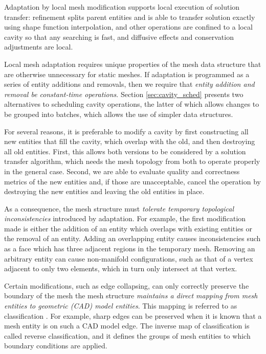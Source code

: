 Adaptation by local mesh modification supports local execution
of solution transfer: refinement splits
parent entities and is able to transfer solution exactly using
shape function interpolation, and other operations are confined
to a local cavity so that any searching is fast,
and diffusive effects and conservation adjustments are local.

Local mesh adaptation requires unique properties of the
mesh data structure that are otherwise unnecessary for
static meshes.
If adaptation is programmed as a series of entity
additions and removals, then we require that \emph{entity
addition and removal be constant-time operations}.
Section \ref{sec:cavity_sched} presents two alternatives
to scheduling cavity operations, the latter of which
allows changes to be grouped into batches, which allows
the use of simpler data structures.

For several reasons, it is preferable to modify a cavity
by first constructing all new entities that fill the cavity,
which overlap with the old, and then destroying all old entities.
First, this allows both versions to be considered by a solution
transfer algorithm, which needs the mesh topology from both
to operate properly in the general case.
Second, we are able to evaluate quality and correctness metrics
of the new entities and, if those are unacceptable, cancel the
operation by destroying the new entities and leaving
the old entities in place.

As a consequence, the mesh structure must \emph{tolerate temporary
topological inconsistencies} introduced by adaptation.
For example, the first modification made is either the addition
of an entity which overlaps with existing entities
or the removal of an entity.
Adding an overlapping entity causes inconsistencies such as
a face which has three adjacent regions in the temporary mesh.
Removing an arbitrary entity can cause non-manifold configurations,
such as that of a vertex adjacent to only two elements, which
in turn only intersect at that vertex.

Certain modifications, such as edge collapsing, can only correctly
preserve the boundary of the mesh the mesh structure \emph{maintains
a direct mapping from mesh entities to geometric (CAD) model
entities}.
This mapping is referred to as classification \cite{schroeder1990combined}.
For example, sharp edges
can be preserved when it is known that a mesh entity is
on such a CAD model edge.
The inverse map of classification is called reverse
classification, and it defines the groups of mesh entities
to which boundary conditions are applied.

